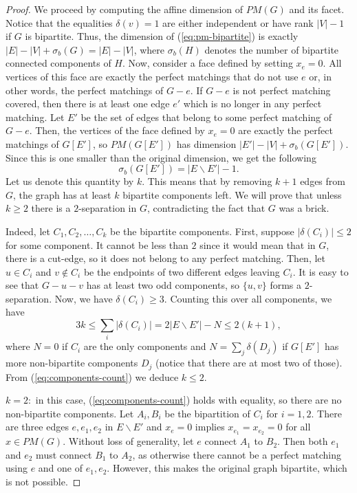 \documentclass[11pt]{article}
\newcommand{\1}{\mathbf{1}}
\newcommand{\0}{\mathbf{0}}
\begin{document}
\begin{proof}
    We proceed by computing the affine dimension of $PM(G)$ and its facet. Notice that the equalities $\delta(v)=1$ are either independent or have rank $|V|-1$ if $G$ is bipartite. Thus, the dimension of (\ref{eq:pm-bipartite}) is exactly $|E|-|V|+\sigma_b(G)=|E|-|V|$, where $\sigma_b(H)$ denotes the number of bipartite connected components of $H$. 
    Now, consider a face defined by setting $x_e=0$. All vertices of this face are exactly the perfect matchings that do not use $e$ or, in other words, the perfect matchings of $G-e$. If $G-e$ is not perfect matching covered, then there is at least one edge $e'$ which is no longer in any perfect matching. Let $E'$ be the set of edges that belong to some perfect matching of $G-e$. Then, the vertices of the face defined by $x_e=0$ are exactly the perfect matchings of $G[E']$, so $PM(G[E'])$ has dimension $|E'|-|V|+\sigma_b(G[E'])$. Since this is one smaller than the original dimension, we get the following \begin{equation*}
        \sigma_b(G[E'])=|E\backslash E'|-1.
    \end{equation*} Let us denote this quantity by $k$. This means that by removing $k+1$ edges from $G$, the graph has at least $k$ bipartite components left. We will prove that unless $k\geq 2$ there is a $2$-separation in $G$, contradicting the fact that $G$ was a brick.

    Indeed, let $C_1, C_2, \ldots, C_k$ be the bipartite components. First, suppose $|\delta(C_i)|\leq 2$ for some component. It cannot be less than $2$ since it would mean that in $G$, there is a cut-edge, so it does not belong to any perfect matching. Then, let $u\in C_i$ and $v\notin C_i$ be the endpoints of two different edges leaving $C_i$. It is easy to see that $G-u-v$ has at least two odd components, so $\{u,v\}$ forms a $2$-separation. Now, we have $\delta(C_i)\geq 3$. Counting this over all components, we have \begin{equation}\label{eq:components-count}
        3k\leq \sum_i |\delta(C_i)|=2|E\backslash E'|-N \leq 2(k+1),
    \end{equation} where $N=0$ if $C_i$ are the only components and $N=\sum_j \delta(D_j)$ if $G[E']$ has more non-bipartite components $D_j$ (notice that there are at most two of those). From (\ref{eq:components-count}) we deduce $k\leq 2$.

    \underline{$k=2:$} in this case, (\ref{eq:components-count}) holds with equality, so there are no non-bipartite components. Let $A_i,B_i$ be the bipartition of $C_i$ for $i=1,2$. There are three edges $e,e_1,e_2$ in $E\backslash E'$ and $x_e=0$ implies $x_{e_1}=x_{e_2}=0$ for all $x \in PM(G)$.
    Without loss of generality, let $e$ connect $A_1$ to $B_2$. Then both $e_1$ and $e_2$ must connect $B_1$ to $A_2$, as otherwise there cannot be a perfect matching using $e$ and one of $e_1, e_2$. However, this makes the original graph bipartite, which is not possible.
    

\end{proof}
\end{document}
